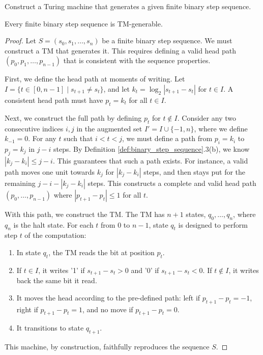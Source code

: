 \begin{definition}
\label{def:construct_tm}
\notready
{}
Construct a Turing machine that generates a given finite binary step sequence.
\end{definition}

\begin{theorem}
\label{thm:finite_sequence_generation}
\notready
{}
Every finite binary step sequence is TM-generable.
\end{theorem}

\begin{proof}
Let $S = (s_0, s_1, \ldots, s_n)$ be a finite binary step sequence. We must construct a TM that generates it. This requires defining a valid head path $(p_0, p_1, \ldots, p_{n-1})$ that is consistent with the sequence properties.

First, we define the head path at moments of writing. Let $I = \{t \in [0, n-1] \mid s_{t+1} \neq s_t\}$, and let $k_t = \log_2|s_{t+1} - s_t|$ for $t \in I$. A consistent head path must have $p_t = k_t$ for all $t \in I$.

Next, we construct the full path by defining $p_t$ for $t \notin I$. Consider any two consecutive indices $i, j$ in the augmented set $I' = I \cup \{-1, n\}$, where we define $k_{-1} = 0$. For any $t$ such that $i < t < j$, we must define a path from $p_i=k_i$ to $p_j=k_j$ in $j-i$ steps. By Definition \ref{def:binary_step_sequence}.3(b), we know $|k_j - k_i| \leq j-i$. This guarantees that such a path exists. For instance, a valid path moves one unit towards $k_j$ for $|k_j - k_i|$ steps, and then stays put for the remaining $j - i - |k_j - k_i|$ steps. This constructs a complete and valid head path $(p_0, \ldots, p_{n-1})$ where $|p_{t+1} - p_t| \leq 1$ for all $t$.

With this path, we construct the TM. The TM has $n+1$ states, $q_0, \ldots, q_n$, where $q_n$ is the halt state. For each $t$ from $0$ to $n-1$, state $q_t$ is designed to perform step $t$ of the computation:
\begin{enumerate}
\item In state $q_t$, the TM reads the bit at position $p_t$.
\item If $t \in I$, it writes '1' if $s_{t+1} - s_t > 0$ and '0' if $s_{t+1} - s_t < 0$. If $t \notin I$, it writes back the same bit it read.
\item It moves the head according to the pre-defined path: left if $p_{t+1}-p_t = -1$, right if $p_{t+1}-p_t=1$, and no move if $p_{t+1}-p_t=0$.
\item It transitions to state $q_{t+1}$.
\end{enumerate}
This machine, by construction, faithfully reproduces the sequence $S$.
\end{proof}

